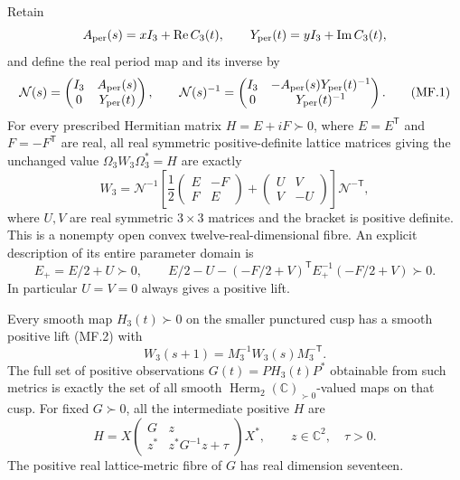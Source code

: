 \begin{theorem}
\label{q444:metric-fibre}
Retain
\[
 A_{\rm per}(s)=xI_3+\operatorname{Re}C_3(t),\qquad
 Y_{\rm per}(t)=yI_3+\operatorname{Im}C_3(t),
\]
and define the real period map and its inverse by
\[
 \mathcal N(s)=
 \begin{pmatrix}I_3&A_{\rm per}(s)\\0&Y_{\rm per}(t)\end{pmatrix},
 \qquad
 \mathcal N(s)^{-1}=
 \begin{pmatrix}
 I_3&-A_{\rm per}(s)Y_{\rm per}(t)^{-1}\\
 0&Y_{\rm per}(t)^{-1}
 \end{pmatrix}.                                             \tag{MF.1}
\]
For every prescribed Hermitian matrix $H=E+iF\succ0$, where
$E=E^{\mathsf T}$ and $F=-F^{\mathsf T}$ are real, all real symmetric
positive-definite lattice matrices giving the unchanged value
$\Omega_3W_3\Omega_3^*=H$ are exactly
\[
 W_3=\mathcal N^{-1}
 \left[
  \frac12\begin{pmatrix}E&-F\\F&E\end{pmatrix}
  +\begin{pmatrix}U&V\\V&-U\end{pmatrix}
 \right]\mathcal N^{-\mathsf T},                             \tag{MF.2}
\]
where $U,V$ are real symmetric $3\times3$ matrices and the bracket is
positive definite.  This is a nonempty open convex twelve-real-dimensional
fibre.  An explicit description of its entire parameter domain is
\[
 E_+=E/2+U\succ0,\qquad
 E/2-U-(-F/2+V)^{\mathsf T}E_+^{-1}(-F/2+V)\succ0.           \tag{MF.3}
\]
In particular $U=V=0$ always gives a positive lift.

Every smooth map $H_3(t)\succ0$ on the smaller punctured cusp has a
smooth positive lift (MF.2) with
\[
 W_3(s+1)=M_3^{-1}W_3(s)M_3^{-\mathsf T}.
                                                               \tag{MF.4}
\]
The full set of positive observations $G(t)=PH_3(t)P^*$ obtainable
from such metrics is exactly the set of all smooth
$\operatorname{Herm}_2(\mathbb C)_{\succ0}$-valued maps on that cusp.
For fixed $G\succ0$, all the intermediate positive $H$ are
\[
 H=X\begin{pmatrix}
       G&z\\ z^*&z^*G^{-1}z+\tau
     \end{pmatrix}X^*,\qquad
 z\in\mathbb C^2,\quad \tau>0.                                \tag{MF.5}
\]
The positive real lattice-metric fibre of $G$ has real dimension
seventeen.
\end{theorem}

